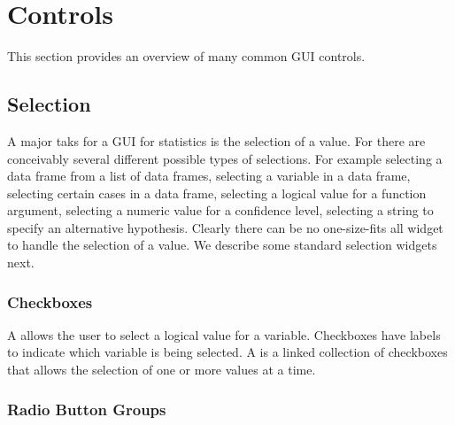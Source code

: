 \section{Controls}
\label{sec:GUI:basic-components}
This section provides an overview of many common GUI controls.


\subsection{Selection}
\label{sec:GUI:basic-selection}

A major taks for a GUI for statistics is the selection of a value. For
\R\/ there are conceivably several different possible types of
selections. For example selecting a data frame from a list of data
frames, selecting a variable in a data frame, selecting certain cases
in a data frame, selecting a logical value for a function argument,
selecting a numeric value for a confidence level, selecting a string
to specify an alternative hypothesis. Clearly there can be no
one-size-fits all widget to handle the selection of a value. We
describe some standard selection widgets next. 



\subsubsection{Checkboxes}
\label{sec:GUI:checkboxes}

A  allows the user to select a logical value for a
variable. Checkboxes have labels to indicate which variable is being
selected. A  is a linked collection of checkboxes
that allows the selection of one or more values at a time.  


\subsubsection{Radio Button Groups}
\label{sec:GUI:radio=button-groups}

